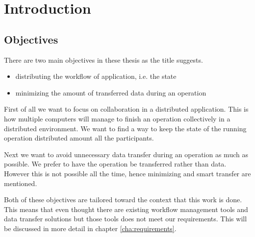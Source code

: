 \chapter{Introduction}
\label{cha:introduction}

\section{Objectives}
There are two main objectives in these thesis as the title suggests.
\begin{itemize}
\item distributing the workflow of application, i.e. the state
\item minimizing the amount of transferred data during an operation
\end{itemize}

First of all we want to focus on collaboration in a distributed application.
This is how multiple computers will manage to finish an operation collectively in a distributed environment.
We want to find a way to keep the state of the running operation distributed amount all the participants.

Next we want to avoid unnecessary data transfer during an operation as much as possible.
We prefer to have the operation be transferred rather than data. However this is not possible all the time,
hence minimizing and smart transfer are mentioned.

Both of these objectives are tailored toward the context that this work is done. This means that even thought 
there are existing workflow management tools and data transfer solutions 
but those tools does not meet our requirements. This will be discussed in more detail in chapter \ref{cha:requirements}.




